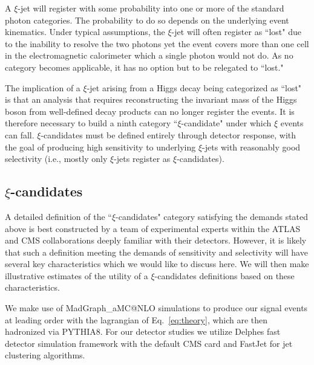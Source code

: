\documentclass[letter,12pt]{article}
\begin{document}
A $\xi$-jet will register with some probability into one or more of the standard photon categories. The probability to do so depends on the underlying event kinematics. Under typical assumptions, the $\xi$-jet will often register as ``lost" due to the inability to resolve the two photons yet the event covers more than one cell in the electromagnetic calorimeter which a single photon would not do. As no category becomes applicable, it has no option but to be relegated to ``lost." 

The implication of a $\xi$-jet arising from a Higgs decay being categorized as ``lost" is that an analysis that requires reconstructing the invariant mass of the Higgs boson from well-defined decay products can no longer register the events. It is therefore necessary to build a ninth category ``$\xi$-candidate" under which $\xi$ events can fall. $\xi$-candidates must be defined entirely through detector response, with the goal of producing high sensitivity to underlying $\xi$-jets with reasonably good selectivity (i.e., mostly only $\xi$-jets register as $\xi$-candidates).
          
\subsection{$\xi$-candidates}
          
A detailed definition of the ``$\xi$-candidates" category satisfying the demands stated above is best constructed by a team of experimental experts within the ATLAS and CMS collaborations deeply familiar with their detectors. However, it is likely that such a definition meeting the demands of sensitivity and selectivity will have several key characteristics which we would like to discuss here. We will then make illustrative estimates of the utility of a $\xi$-candidates definitions based on these characteristics. 

We make use of MadGraph\_aMC@NLO\cite{madgraph} simulations to produce our signal events at leading order with the lagrangian of Eq.~\ref{eq:theory}, which are then hadronized via PYTHIA8\cite{pythia1,pythia2}. For our detector studies we utilize Delphes\cite{delphes} fast detector simulation framework with the default CMS card and FastJet\cite{fastjet} for jet clustering algorithms. 
\end{document}
